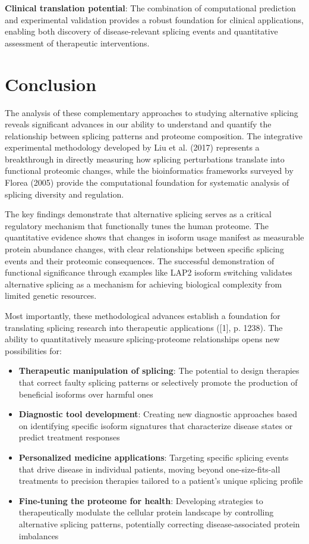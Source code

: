 \documentclass[12pt,a4paper]{article}
\begin{document}
\textbf{Clinical translation potential}: The combination of computational prediction and experimental validation provides a robust foundation for clinical applications, enabling both discovery of disease-relevant splicing events and quantitative assessment of therapeutic interventions.

\section{Conclusion}

The analysis of these complementary approaches to studying alternative splicing reveals significant advances in our ability to understand and quantify the relationship between splicing patterns and proteome composition. The integrative experimental methodology developed by Liu et al. (2017) represents a breakthrough in directly measuring how splicing perturbations translate into functional proteomic changes, while the bioinformatics frameworks surveyed by Florea (2005) provide the computational foundation for systematic analysis of splicing diversity and regulation.

The key findings demonstrate that alternative splicing serves as a critical regulatory mechanism that functionally tunes the human proteome. The quantitative evidence shows that changes in isoform usage manifest as measurable protein abundance changes, with clear relationships between specific splicing events and their proteomic consequences. The successful demonstration of functional significance through examples like LAP2 isoform switching validates alternative splicing as a mechanism for achieving biological complexity from limited genetic resources.

Most importantly, these methodological advances establish a foundation for translating splicing research into therapeutic applications ([1], p. 1238). The ability to quantitatively measure splicing-proteome relationships opens new possibilities for:

\begin{itemize}
    \item \textbf{Therapeutic manipulation of splicing}: The potential to design therapies that correct faulty splicing patterns or selectively promote the production of beneficial isoforms over harmful ones
    \item \textbf{Diagnostic tool development}: Creating new diagnostic approaches based on identifying specific isoform signatures that characterize disease states or predict treatment responses
    \item \textbf{Personalized medicine applications}: Targeting specific splicing events that drive disease in individual patients, moving beyond one-size-fits-all treatments to precision therapies tailored to a patient's unique splicing profile
    \item \textbf{Fine-tuning the proteome for health}: Developing strategies to therapeutically modulate the cellular protein landscape by controlling alternative splicing patterns, potentially correcting disease-associated protein imbalances
\end{itemize}
\end{document}
